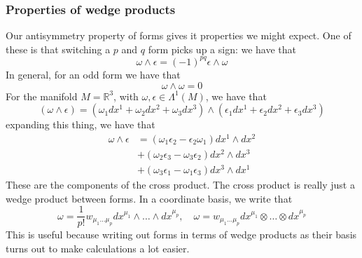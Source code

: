 \subsubsection{Properties of wedge products} 
Our antisymmetry property of forms 
gives it properties we might expect. 
One of these is that switching a $ p $ and $ q $ form 
picks up a sign:  we have that 
\[
\omega \wedge \epsilon  = ( - 1) ^{ p q } \epsilon \wedge  \omega    
\] In general, for an odd form we have that 
\[
\omega  \wedge  \omega = 0 
\] For the manifold $ M = \mathbb{ R} ^ 3 $, with $ \omega  , \epsilon \in \Lambda^ 1 ( M) $, 
we have that 
\[
( \omega  \wedge  \epsilon ) = ( \omega_1 dx^1 + \omega_2 dx^ 2 + \omega_3 dx^ 3 ) \wedge  ( \epsilon_1 dx^1 + \epsilon_2 dx^2 + \epsilon_3 dx^3 ) 
\] expanding this thing, we have that 
\begin{align*}
\omega  \wedge  \epsilon & = ( \omega_1 \epsilon_2  - \epsilon_2 \omega_1 ) dx^1 \wedge  dx^ 2 \\
			 & + ( \omega_2\epsilon_3 - \omega_3 \epsilon_2 ) dx^ 2 \wedge  dx^ 3 \\
			 & + ( \omega_3\epsilon_1  -\omega_1 \epsilon_3 ) dx^3 \wedge  dx^1 
\end{align*}
These are the components of the cross product. The cross product 
is really just a wedge product between forms. 
In a coordinate basis, we write that 
\[
\omega  = \frac{1}{p ! } w_{ \mu_1 \dots \mu_{ p }} dx^{ \mu_1 } \wedge  \dots \wedge  dx^{ \mu_{ p }}, \quad \omega =  w_{ \mu_ 1 \dots \mu_{ p  } } dx^{ \mu_ 1 } \otimes \dots \otimes dx^{ \mu_{ p } }  
\] This is useful because writing out forms in terms of wedge 
products as their basis turns out to make calculations a lot easier. 

